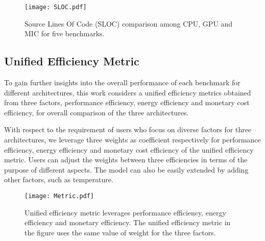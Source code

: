 %
    \begin{figure}[h!]
  \centering
  \begin{minipage}{0.5\textwidth}
    \centering
   \centering
     \texttt{[image: SLOC.pdf]}    
  \caption{Source Lines Of Code (SLOC) comparison among CPU, GPU and MIC for five benchmarks.}
  \label{fig:sloc}
\end{minipage}%
\end{figure}
  


\subsection{Unified Efficiency Metric}

To gain further insights into the overall performance of each benchmark for different architectures, 
this work considers a unified efficiency metrics obtained from three factors, performance efficiency, energy efficiency and 
monetary cost efficiency, for overall comparison of the three architectures. %


With respect to the requirement of users who focus on diverse factors for three architectures, we leverage three weights as coefficient respectively for performance efficiency, energy efficiency and monetary cost efficiency of the unified efficiency metric. Users can adjust the weights between three efficiencies in terms of the purpose of different aspects. The model can also be easily extended by adding other factors, such as temperature. 

    \begin{figure}[h!]
  \centering
  \begin{minipage}{0.5\textwidth}
    \centering
   \centering
     \texttt{[image: Metric.pdf]}    
  \caption{Unified efficiency metric leverages performance efficiency, energy efficiency and monetary efficiency. %
  The unified efficiency metric in the figure uses the same value of weight for the three factors.}
  \label{fig:metric}
\end{minipage}%
\end{figure}

